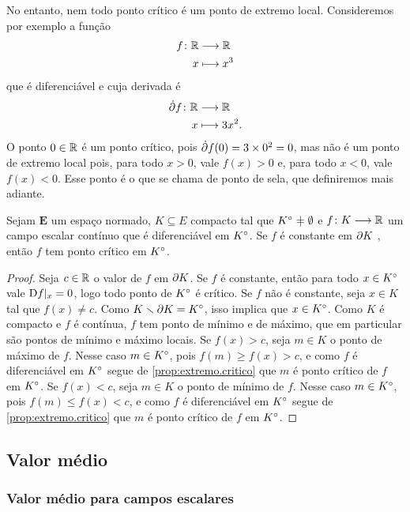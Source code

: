 No entanto, nem todo ponto crítico é um ponto de extremo local. Consideremos por exemplo a função
	\begin{align*}
	{f}\colon {\mathbb{R}} &\longrightarrow {\mathbb{R}} \\{x} &\longmapsto x^3
	\end{align*}
que é diferenciável e cuja derivada é
	\begin{align*}
	{\dot{\partial}f}\colon {\mathbb{R}} &\longrightarrow {\mathbb{R}} \\{x} &\longmapsto 3x^2.
	\end{align*}
O ponto $0 \in \mathbb{R}$ é um ponto crítico, pois $\dot{\partial} f(0) = 3 \times 0^2 = 0$, mas não é um ponto de extremo local pois, para todo $x>0$, vale $f(x)>0$ e, para todo $x<0$, vale $f(x)<0$. Esse ponto é o que se chama de ponto de sela, que definiremos mais adiante.

\begin{proposition}
\label{prop:compacto.critico}
Sejam $\bm E$ um espaço normado, $K \subseteq E$ compacto tal que $\Int{K} \neq \emptyset$ e ${f}\colon {K} \longrightarrow {\mathbb{R}}$ um campo escalar contínuo que é diferenciável em ${K}^\circ$. Se $f$ é constante em $\partial{K}$%
, então $f$ tem ponto crítico em ${K}^\circ$.
\end{proposition}
\begin{proof}
Seja $c \in \mathbb{R}$ o valor de $f$ em $\partial{K}$. Se $f$ é constante, então para todo $x \in {K}^\circ$ vale $\mathrm{D} f|_x = 0$, logo todo ponto de ${K}^\circ$ é crítico. Se $f$ não é constante, seja $x \in K$ tal que $f(x) \neq c$. Como $K \smallsetminus \partial{K} = {K}^\circ$, isso implica que $x \in {K}^\circ$. Como $K$ é compacto e $f$ é contínua, $f$ tem ponto de mínimo e de máximo, que em particular são pontos de mínimo e máximo locais. Se $f(x) > c$, seja $m \in K$ o ponto de máximo de $f$. Nesse caso $m \in {K}^\circ$, pois $f(m) \geq f(x) > c$, e como $f$ é diferenciável em ${K}^\circ$ segue de \ref{prop:extremo.critico} que $m$ é ponto crítico de $f$ em ${K}^\circ$. Se $f(x) < c$, seja $m \in K$ o ponto de mínimo de $f$. Nesse caso $m \in {K}^\circ$, pois $f(m) \leq f(x) < c$, e como $f$ é diferenciável em ${K}^\circ$ segue de \ref{prop:extremo.critico} que $m$ é ponto crítico de $f$ em ${K}^\circ$.
\end{proof}

\subsection{Valor médio}

\subsubsection{Valor médio para campos escalares}

